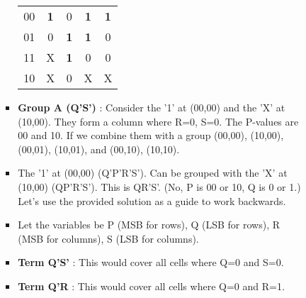 \documentclass{article}
\begin{document}
\begin{itemize}
\begin{itemize}
\begin{enumerate}
\begin{itemize}
\begin{tabular}{|c|c|c|c|c|}
 00 & \textbf{1} & 0 & \textbf{1} & \textbf{1} \\ 01 & 0 & \textbf{1} & \textbf{1} & 0 \\ 11 & X & \textbf{1} & 0 & 0 \\ 10 & X & 0 & X & X \\ \hline

\end{tabular}


            \item \textbf{Group A (Q'S')} : Consider the '1' at (00,00) and the 'X' at (10,00). They form a column where R=0, S=0. The P-values are 00 and 10. If we combine them with a group (00,00), (10,00), (00,01), (10,01), and (00,10), (10,10).
                \item The '1' at (00,00) (Q'P'R'S'). Can be grouped with the 'X' at (10,00) (QP'R'S'). This is QR'S'. (No, P is 00 or 10, Q is 0 or 1.) Let's use the provided solution as a guide to work backwards.
            \item Let the variables be P (MSB for rows), Q (LSB for rows), R (MSB for columns), S (LSB for columns).
                \item \textbf{Term Q'S'} : This would cover all cells where Q=0 and S=0.
            \item \textbf{Term Q'R} : This would cover all cells where Q=0 and R=1.
\end{itemize}
\end{enumerate}
\end{itemize}
\end{itemize}
\end{document}

